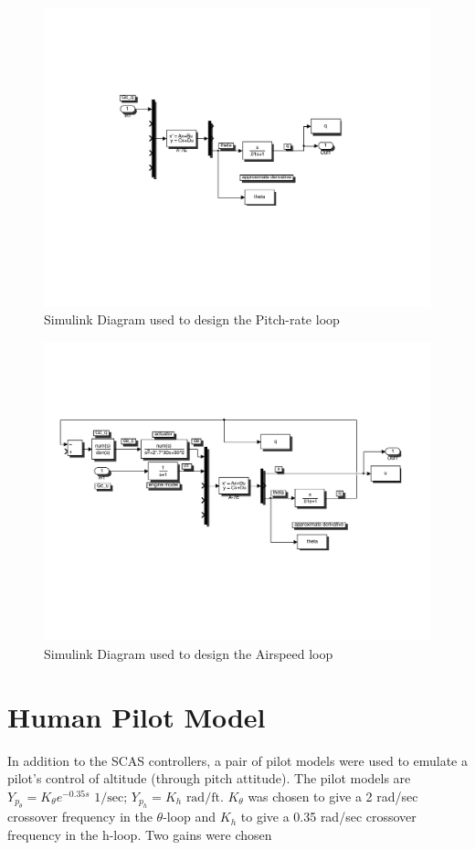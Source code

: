 \documentclass[12pt]{article}
\begin{document}
\begin{figure}[h!]
\begin{center}
\includegraphics[width=.95\textwidth]{figures/controller1}
\caption{Simulink Diagram used to design the Pitch-rate loop}
\end{center}
\end{figure}

\begin{figure}[h!]
\begin{center}
\includegraphics[width=.95\textwidth]{figures/controller2}
\caption{Simulink Diagram used to design the Airspeed loop}
\end{center}
\end{figure}

\clearpage
\section{Human Pilot Model}
In addition to the SCAS controllers, a pair of pilot models were used to emulate a pilot's control of altitude (through pitch attitude). The pilot models are $Y_{p_{\theta}} = K_{\theta}e^{-0.35 s} \mbox{ 1/sec}\mbox{; }Y_{p_{h}} = K_{h} \mbox{ rad/ft}$.
$K_{\theta}$ was chosen to give a 2 rad/sec crossover frequency in the $\theta$-loop and $K_h$ to give a 0.35 rad/sec crossover frequency in the h-loop. Two gains were chosen
\end{document}
